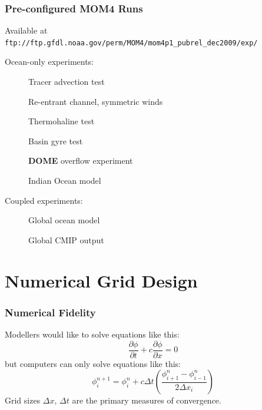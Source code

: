 \documentclass{beamer}
\begin{document}
\begin{frame}[fragile]
    \frametitle{Pre-configured MOM4 Runs}
    
    Available at
    {\small
    \lstinline|ftp://ftp.gfdl.noaa.gov/perm/MOM4/mom4p1_pubrel_dec2009/exp/|}
    
    \vspace{10pt}

    Ocean-only experiments:
    \begin{description}
        \item[] Tracer advection test
        \item[] Re-entrant channel, symmetric winds
        \item[] Thermohaline test
        \item[] Basin gyre test
        \item[] \textbf{DOME} overflow experiment
        \item[] Indian Ocean model
    \end{description}
    
    Coupled experiments:
    \begin{description}
        \item[] Global ocean model
        \item[] Global CMIP output
    \end{description}
\end{frame}

\section{Numerical Grid Design}
\begin{frame}
    \frametitle{Numerical Fidelity}
    
    Modellers would like to solve equations like this:
    $$
    \frac{\partial \phi}{\partial t} + c \frac{\partial \phi}{\partial x} = 0
    $$
    but computers can only solve equations like this:
    $$
    \phi^{n+1}_i = \phi^n_i + c \Delta t
        \left(\frac{\phi^n_{i+1} - \phi^n_{i-1}}{2\Delta x_i} \right)
    $$
    Grid sizes $\Delta x$, $\Delta t$ are the primary measures of convergence.
\end{frame}
\end{document}
